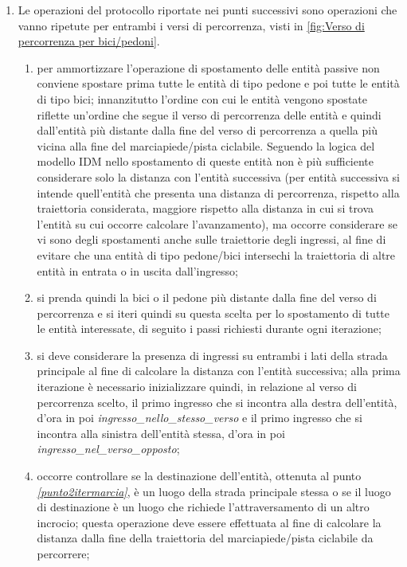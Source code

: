 \begin{enumerate}
\item[]
\begin{description}
Le operazioni del protocollo riportate nei punti successivi sono operazioni che vanno ripetute per entrambi i versi di percorrenza, visti in \ref{fig:Verso di percorrenza per bici/pedoni}.
\end{description}
\begin{enumerate}
\item per ammortizzare l'operazione di spostamento delle entità passive non conviene spostare prima tutte le entità di tipo pedone e poi tutte le entità di tipo bici; innanzitutto l'ordine con cui le entità vengono spostate riflette un'ordine che segue il verso di percorrenza delle entità e quindi dall'entità più distante dalla fine del verso di percorrenza a quella più vicina alla fine del marciapiede/pista ciclabile. Seguendo la logica del modello \ac{IDM} nello spostamento di queste entità non è più sufficiente considerare solo la distanza con l'entità successiva (per entità successiva si intende quell'entità che presenta una distanza di percorrenza, rispetto alla traiettoria considerata, maggiore rispetto alla distanza in cui si trova l'entità su cui occorre calcolare l'avanzamento), ma occorre considerare se vi sono degli spostamenti anche sulle traiettorie degli ingressi, al fine di evitare che una entità di tipo pedone/bici intersechi la traiettoria di altre entità in entrata o in uscita dall'ingresso;
\item \label{punto2itermarcia} si prenda quindi la bici o il pedone più distante dalla fine del verso di percorrenza e si iteri quindi su questa scelta per lo spostamento di tutte le entità interessate, di seguito i passi richiesti durante ogni iterazione;
\item si deve considerare la presenza di ingressi su entrambi i lati della strada principale al fine di calcolare la distanza con l'entità successiva; alla prima iterazione è necessario inizializzare quindi, in relazione al verso di percorrenza scelto, il primo ingresso che si incontra alla destra dell'entità, d'ora in poi \textit{ingres\-so\_nel\-lo\_stes\-so\_ver\-so} e il primo ingresso che si incontra alla sinistra dell'entità stessa, d'ora in poi \textit{ingres\-so\_nel\_ver\-so\_op\-pos\-to};   
\item occorre controllare se la destinazione dell'entità, ottenuta al punto \textit{\ref{punto2itermarcia}}, è un luogo della strada principale stessa o se il luogo di destinazione è un luogo che richiede l'attraversamento di un altro incrocio; questa operazione deve essere effettuata al fine di calcolare la distanza dalla fine della traiettoria del marciapiede/pista ciclabile da percorrere;

\end{enumerate}
\end{enumerate}
